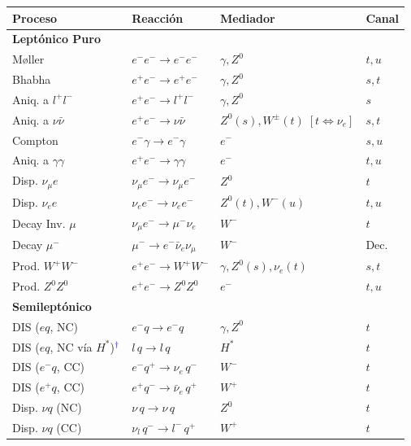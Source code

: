 {
\centering
\scriptsize
\setlength{\tabcolsep}{3pt} 
\renewcommand{\arraystretch}{0.95}
\begin{tabular}{@{}llll@{}}
\textbf{Proceso} & \textbf{Reacción} & \textbf{Mediador} & \textbf{Canal} \\
\midrule
\multicolumn{4}{l}{\textbf{Leptónico Puro}} \\
Møller & $e^- e^- \to e^- e^-$ & $\gamma, Z^0$ & $t, u$ \\
Bhabha & $e^+ e^- \to e^+ e^-$ & $\gamma, Z^0$ & $s, t$ \\
Aniq. a $l^+l^-$ & $e^+ e^- \to l^+ l^-$ & $\gamma, Z^0$ & $s$ \\
Aniq. a $\nu\bar{\nu}$ & $e^+ e^- \to \nu \bar{\nu}$ & $Z^0 (s), W^\pm (t) \; [t\iff\nu_e] $ & $s, t$ \\
Compton & $e^- \gamma \to e^- \gamma$ & $e^-$ & $s, u$ \\
Aniq. a $\gamma\gamma$ & $e^+ e^- \to \gamma \gamma$ & $e^-$ & $t, u$ \\
Disp. $\nu_\mu e$ & $\nu_\mu e^- \to \nu_\mu e^-$ & $Z^0$ & $t$ \\
Disp. $\nu_e e$ & $\nu_e e^- \to \nu_e e^-$ & $Z^0 (t), W^- (u)$ & $t, u$ \\
Decay Inv. $\mu$ & $\nu_\mu e^- \to \mu^- \nu_e$ & $W^-$ & $t$ \\
Decay $\mu^-$ & $\mu^- \to e^- \bar{\nu}_e \nu_\mu$ & $W^-$ & Dec. \\
Prod. $W^+W^-$ & $e^+ e^- \to W^+ W^-$ & $\gamma, Z^0 (s), \nu_e (t)$ & $s, t$ \\
Prod. $Z^0Z^0$ & $e^+ e^- \to Z^0 Z^0$ & $e^-$ & $t, u$ \\
\midrule
\multicolumn{4}{l}{\textbf{Semileptónico}} \\
DIS ($eq$, NC)             & $e^- q \to e^- q$                   & $\gamma, Z^0$        & $t$ \\
DIS ($eq$, NC vía $H^*$)$\color{blue}^\dagger\color{black}$  & $l\, q \to l\, q$          & $H^*$                & $t$ \\
DIS ($e^-q$, CC)           & $e^- q^+ \to \nu_e\, q^-$           & $W^-$                & $t$ \\
DIS ($e^+q$, CC)           & $e^+ q^- \to \bar{\nu}_e\, q^+$     & $W^+$                & $t$ \\
Disp. $\nu q$ (NC)         & $\nu\, q \to \nu\, q$               & $Z^0$                & $t$ \\
Disp. $\nu q$ (CC)         & $\nu_l\, q^- \to l^-\, q^+$         & $W^+$                & $t$ \\

\end{tabular}}
